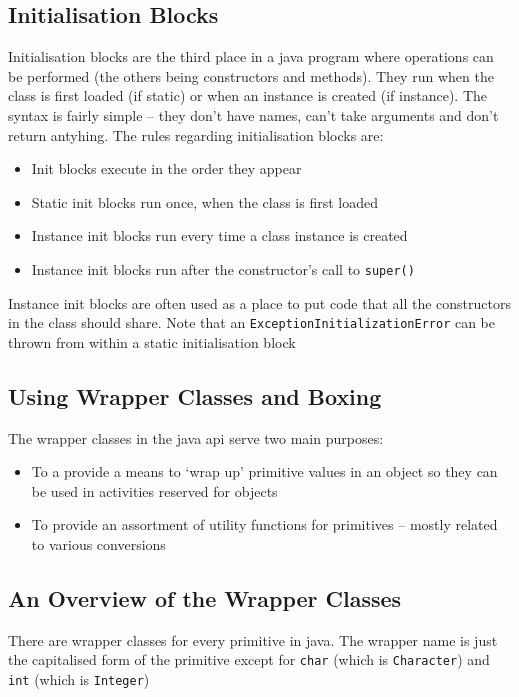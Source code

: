 \subsection{Initialisation Blocks}
Initialisation blocks are the third place in a java program where operations 
can be performed (the others being constructors and methods). They run when the 
class is first loaded (if static) or when an instance is created (if instance).  
The syntax is fairly simple -- they don't have names, can't take arguments and 
don't return antyhing. The rules regarding initialisation blocks are:
\begin{itemize}
    \item Init blocks execute in the order they appear
    \item Static init blocks run once, when the class is first loaded
    \item Instance init blocks run every time a class instance is created
    \item Instance init blocks run after the constructor's call to 
    \verb#super()#
\end{itemize}
Instance init blocks are often used as a place to put code that all the 
constructors in the class should share. Note that an 
\verb#ExceptionInitializationError# can be thrown from within a static 
initialisation block

\subsection{Using Wrapper Classes and Boxing}
The wrapper classes in the java api serve two main purposes:
\begin{itemize}
    \item To a provide a means to `wrap up' primitive values in an object so 
    they can be used in activities reserved for objects
    \item To provide an assortment of utility functions for primitives -- 
    mostly related to various conversions
\end{itemize}

\subsection{An Overview of the Wrapper Classes}
There are wrapper classes for every primitive in java. The wrapper name is just 
the capitalised form of the primitive except for \verb#char# (which is 
\verb#Character#) and \verb#int# (which is \verb#Integer#)

